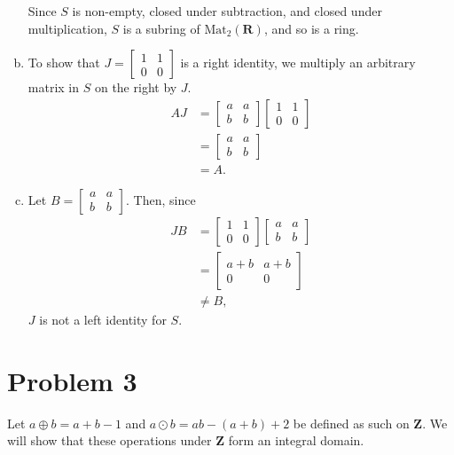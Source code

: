 \documentclass[10pt]{extarticle}
\begin{document}
\begin{enumerate}[(a)]
      Since $S$ is non-empty, closed under subtraction, and closed under multiplication, $S$ is a subring of $\text{Mat}_{2}(\mathbf{R})$, and so is a ring.
    \item To show that $J = \begin{bmatrix}1&1\\0&0\end{bmatrix}$ is a right identity, we multiply an arbitrary matrix in $S$ on the right by $J$.
      \begin{align*}
        AJ &=\begin{bmatrix}a&a\\b&b\end{bmatrix} \begin{bmatrix}1&1\\0&0\end{bmatrix} \\
        &= \begin{bmatrix}a&a\\b&b\end{bmatrix}\\
        &= A.
      \end{align*}
    \item Let $B = \begin{bmatrix}a&a\\b&b\end{bmatrix}$. Then, since
      \begin{align*}
        JB &= \begin{bmatrix}1&1\\0&0\end{bmatrix} \begin{bmatrix}a&a\\b&b\end{bmatrix}\\
           &= \begin{bmatrix}a+b&a+b\\0&0\end{bmatrix}\\
           &\neq B,
      \end{align*}
      $J$ is not a left identity for $S$.
  \end{enumerate}
  \section{Problem 3}%
  Let $a\oplus b = a+b-1$ and $a\odot b = ab - (a+b) + 2$ be defined as such on $\mathbf{Z}$. We will show that these operations under $\mathbf{Z}$ form an integral domain.\\
\end{document}
